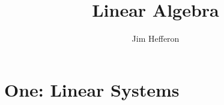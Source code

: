 \documentclass[fontsize=10]{book}
\begin{document}
\title{Linear Algebra}
\author{Jim Hefferon}

\tableofcontents

\chapter{One: Linear Systems}
\end{document}
